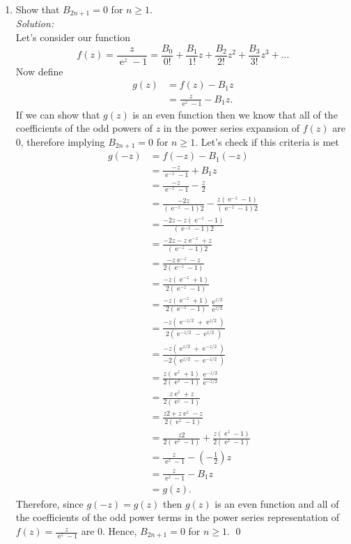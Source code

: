 \documentclass[10pt]{amsart}
\DeclareMathOperator{\E}{e}
\theoremstyle{nonumberplain}
\begin{document}
\begin{enumerate}[label={\bf {\arabic*}:}]
\begin{enumerate}
\item Show that $B_{2 n+1}=0$ for $n \geq 1$. \\
\textit{Solution:} \\
Let's consider our function
$$f(z) = \frac z {\E^z - 1} = \frac {B_0}{0!} + \frac {B_1}{1!}z + \frac {B_2}{2!}z^2 + \frac {B_3}{3!}z^3 + ...$$
Now define
\begin{align*}
g(z) &= f(z) - B_1z \\
	&= \frac z {\E^z - 1} - B_1z.
\end{align*}
If we can show that $g(z)$ is an even function then we know that all of the coefficients of the odd powers of $z$ in the power series expansion of $f(z)$ are 0, therefore implying $B_{2 n+1}=0$ for $n \geq 1$.
Let's check if this criteria is met
\begin{align*}
g(-z) &= f(-z) - B_1(-z) \\
	&= \frac {-z} {\E^{-z} - 1} + B_1z \\
	&= \frac {-z} {\E^{-z} - 1} -\frac z 2 \\
	&= \frac {-2z} {(\E^{-z} - 1)2} -\frac {z (\E^{-z} - 1)} {(\E^{-z} - 1)2} \\
	&= \frac {-2z - z (\E^{-z} - 1)} {(\E^{-z} - 1)2} \\
	&= \frac {-2z - z\E^{-z} + z} {(\E^{-z} - 1)2} \\
	&= \frac {-z\E^{-z} -z} {2(\E^{-z} - 1)} \\
	&= \frac {-z(\E^{-z} +1)} {2(\E^{-z} - 1)} \\
	&= \frac {-z(\E^{-z} +1)} {2(\E^{-z} - 1)} \frac {\E^{z/2}}{\E^{z/2}} \\
	&= \frac {-z(\E^{-z/2} +\E^{z/2})} {2(\E^{-z/2} - \E^{z/2})} \\
	&= \frac {-z(\E^{z/2} +\E^{-z/2})} {-2(\E^{z/2} - \E^{-z/2})} \\
	&= \frac {z(\E^{z} +1)} {2(\E^{z} - 1)} \frac {\E^{-z/2}}{\E^{-z/2}} \\
	&= \frac {z\E^{z} + z} {2(\E^{z} - 1)} \\
	&= \frac {z2 + z\E^{z} - z} {2(\E^{z} - 1)} \\
	&= \frac {z2} {2(\E^{z} - 1)} + \frac {z(\E^{z} - 1)}{2(\E^{z} - 1)} \\
	&= \frac {z} {\E^{z} - 1} - (-\frac 1 2) z \\
	&= \frac {z} {\E^{z} - 1} - B_1 z \\
	&= g(z).
\end{align*}
Therefore, since $g(-z) = g(z)$ then $g(z)$ is an even function and all of the coefficients of the odd power terms in the power series representation of $f(z) = \frac z {\E^z - 1}$ are 0.
Hence, $B_{2 n+1}=0$ for $n \geq 1$.
\qed \\


\end{enumerate}
\end{enumerate}
\end{document}
